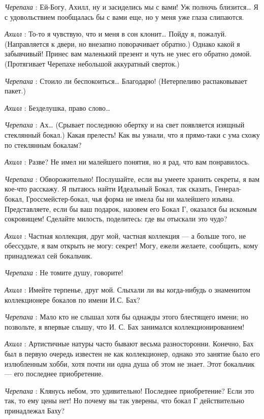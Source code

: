 \emph{Черепаха} : Ей-Богу, Ахилл, ну и засиделись мы с вами! Уж полночь близится\ldots{} Я с удовольствием пообщалась бы с вами еще, но у меня уже глаза слипаются.

\emph{Ахилл} : То-то я чувствую, что и меня в сон клонит\ldots{} Пойду я, пожалуй. (Направляется к двери, но внезапно поворачивает обратно.) Однако какой я забывчивый! Принес вам маленький презент и чуть не унес его обратно домой. (Протягивает Черепахе небольшой аккуратный сверток.)

\emph{Черепаха} : Стоило ли беспокоиться\ldots{} Благодарю! (Нетерпеливо распаковывает пакет.)

\emph{Ахилл} : Безделушка, право слово\ldots{}

\emph{Черепаха} : Ах\ldots{} (Срывает последнюю обертку и на свет появляется изящный стеклянный бокал.) Какая прелесть! Как вы узнали, что я прямо-таки с ума схожу по стеклянным бокалам?

\emph{Ахилл} : Разве? Не имел ни малейшего понятия, но я рад, что вам понравилось.

\emph{Черепаха} : Обворожительно! Послушайте, если вы умеете хранить секреты, я вам кое-что расскажу. Я пытаюсь найти Идеальный Бокал, так сказать, Генерал-бокал, Гроссмейстер-бокал, чья форма не имела бы ни малейшего изъяна. Представляете, если бы ваш подарок, назовем его Бокал Г, оказался бы искомым сокровищем! Сделайте милость, поделитесь: где вы отыскали это чудо?

\emph{Ахилл} : Частная коллекция, друг мой, частная коллекция --- а больше того, не обессудьте, я вам открыть не могу: секрет! Могу, ежели желаете, сообщить, кому принадлежал сей бокальчик.

\emph{Черепаха} : Не томите душу, говорите!

\emph{Ахилл} : Имейте терпенье, друг мой. Слыхали ли вы когда-нибудь о знаменитом коллекционере бокалов по имени И.С. Бах?

\emph{Черепаха} : Мало кто не слышал хотя бы однажды этого блестящего имени; но позвольте, я впервые слышу, что И. С. Бах занимался коллекционированием!

\emph{Ахилл} : Артистичные натуры часто бывают весьма разносторонни. Конечно, Бах был в первую очередь известен не как коллекционер, однако это занятие было его излюбленным хобби, хотя почти ни одна душа об этом не знает. Этот бокальчик --- его последнее приобретение.

\emph{Черепаха} : Клянусь небом, это удивительно! Последнее приобретение? Если это так, то ему цены нет! Но почему вы так уверены, что бокал Г действительно принадлежал Баху?

